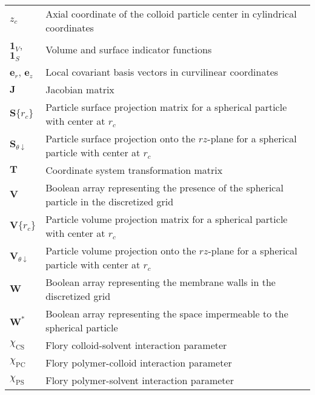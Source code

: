 \documentclass[10pt, a4paper]{article}
\begin{document}
\begin{tabularx}{\linewidth}{l X}
    $z_{c}$ & Axial coordinate of the colloid particle center in cylindrical coordinates \\
    $\bm{1}_{V}$, $\bm{1}_{S}$ & Volume and surface indicator functions \\
    $\bm{e}_r$, $\bm{e}_z$ & Local covariant basis vectors in curvilinear coordinates \\
    $\bm{J}$ & Jacobian matrix \\
    $\bm{S}\{r_{c}\}$ & Particle surface projection matrix for a spherical particle with center at $r_{c}$ \\
    $\bm{S}_{\theta\downarrow}$ & Particle surface projection onto the $rz$-plane for a spherical particle with center at $r_{c}$ \\
    $\bm{T}$ & Coordinate system transformation matrix \\
    $\bm{V}$ & Boolean array representing the presence of the spherical particle in the discretized grid \\
    $\bm{V}\{r_{c}\}$ & Particle volume projection matrix for a spherical particle with center at $r_{c}$ \\
    $\bm{V}_{\theta\downarrow}$ & Particle volume projection onto the $rz$-plane for a spherical particle with center at $r_{c}$ \\
    $\bm{W}$ & Boolean array representing the membrane walls in the discretized grid \\
    $\bm{W}^{\ast}$ & Boolean array representing the space impermeable to the spherical particle \\
    $\chi_{\text{CS}}$ & Flory colloid-solvent interaction parameter \\
    $\chi_{\text{PC}}$ & Flory polymer-colloid interaction parameter \\
    $\chi_{\textrm{PS}}$ & Flory polymer-solvent interaction parameter \\
\end{tabularx}

\printbibliography
\end{document}

